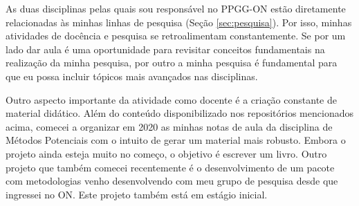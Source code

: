 As duas disciplinas pelas quais sou responsável no PPGG-ON estão diretamente relacionadas
às minhas linhas de pesquisa (Seção \ref{sec:pesquisa}). Por isso, minhas atividades de
docência e pesquisa se retroalimentam constantemente. Se por um lado dar 
aula é uma oportunidade para revisitar conceitos fundamentais na realização da minha
pesquisa, por outro a minha pesquisa é fundamental para que eu possa incluir tópicos 
mais avançados nas disciplinas. 

Outro aspecto importante da atividade como docente é a criação constante de material 
didático. Além do conteúdo disponibilizado nos repositórios mencionados acima, comecei a
organizar em 2020 as minhas notas de aula da disciplina de Métodos Potenciais com o intuito
de gerar um material mais robusto. Embora o projeto ainda esteja muito no começo,
o objetivo é escrever um livro. Outro projeto que também comecei recentemente é o
desenvolvimento de um pacote com metodologias venho desenvolvendo com meu grupo de pesquisa
desde que ingressei no ON. Este projeto também está em estágio inicial.


